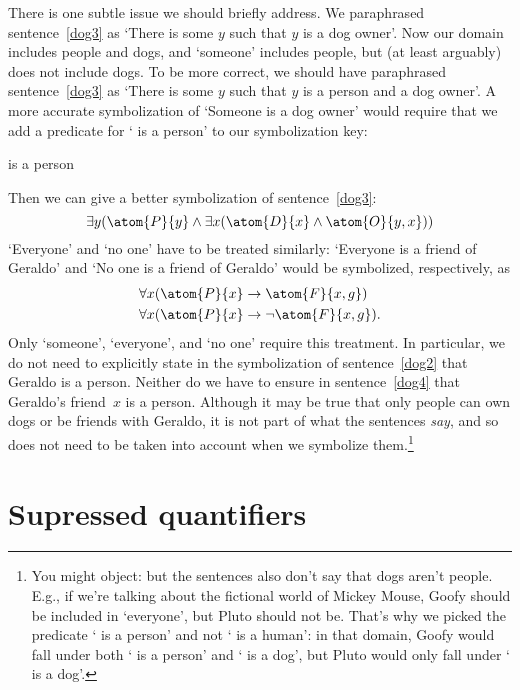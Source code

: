 There is one subtle issue we should briefly address. We paraphrased
sentence~\ref{dog3} as `There is some $y$ such that $y$ is a dog owner'.
Now our domain includes people and dogs, and `someone' includes
people, but (at least arguably) does not include dogs.  To be more
correct, we should have paraphrased sentence~\ref{dog3} as `There is
some $y$ such that $y$ is a person and a dog owner'. A more accurate
symbolization of `Someone is a dog owner' would require that we add a
predicate for `\blank{} is a person' to our symbolization key:
\begin{ekey}
	\item[\atom{P}{x}]  is a person
\end{ekey}
Then we can give a better symbolization of sentence~\ref{dog3}:
$$\exists y (\atom{P}{y} \eand \exists x(\atom{D}{x} \eand
\atom{O}{y,x}))$$
`Everyone' and `no one' have to be treated similarly: `Everyone
is a friend of Geraldo' and `No one is a friend of Geraldo' would be
symbolized, respectively, as
\begin{align*}
	& \forall x(\atom{P}{x} \eif \atom{F}{x,g})\\
	& \forall x(\atom{P}{x} \eif \enot\atom{F}{x,g}).
\end{align*}
Only `someone', `everyone', and `no one' require this treatment. In
particular, we do not need to explicitly state in the symbolization of
sentence~\ref{dog2} that Geraldo is a person. Neither do we have to
ensure in sentence~\ref{dog4} that Geraldo's friend~$x$ is a person.
Although it may be true that only people can own dogs or be friends
with Geraldo, it is not part of what the sentences \emph{say}, and so
does not need to be taken into account when we symbolize
them.\footnote{You might object: but the sentences also don't say that
dogs aren't people. E.g., if we're talking about the fictional world
of Mickey Mouse, Goofy should be included in `everyone', but Pluto
should not be.  That's why we picked the predicate `\blank{} is a
person' and not `\blank{} is a human': in that domain, Goofy would
fall under both `\blank{} is a person' and `\blank{} is a dog', but
Pluto would only fall under `\blank{} is a dog'.}

\section{Supressed quantifiers}\label{ss:SuppQuant}

